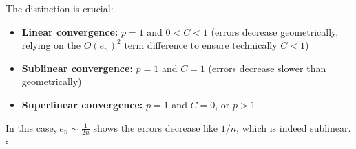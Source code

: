 The distinction is crucial:
\begin{itemize}
\item \textbf{Linear convergence:} $p = 1$ and $0 < C < 1$ (errors decrease geometrically, relying on the $O(e_n)^2$ term difference to ensure technically $C < 1$)
\item \textbf{Sublinear convergence:} $p = 1$ and $C = 1$ (errors decrease slower than geometrically)
\item \textbf{Superlinear convergence:} $p = 1$ and $C = 0$, or $p > 1$
\end{itemize}

In this case, $e_n \sim \frac{1}{2n}$ shows the errors decrease like $1/n$, which is indeed sublinear. $\square$